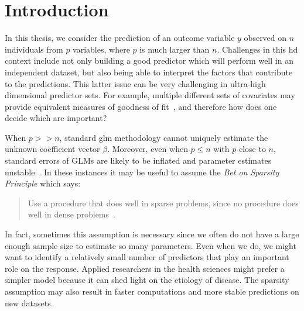 \chapter{Introduction\label{ch:introduction}}


In this thesis, we consider the prediction of an outcome variable $y$ observed on $n$ individuals from $p$ variables, where $p$ is much larger than $n$. 
Challenges in this \ac{hd} context include not only building a good predictor which will perform well in an independent dataset, but also being able to interpret the factors that contribute to the predictions. 
This latter issue can be very challenging in ultra-high dimensional predictor sets. 
For example, multiple different sets of covariates may provide equivalent measures of goodness of fit~\citep{fan2014challenges}, and therefore how does one decide which are important? 

When $p >>n$, standard \ac{glm} methodology cannot uniquely estimate the unknown coefficient vector $\beta$. 
Moreover, even when $p \leq n$ with $p$ close to $n$, standard errors of GLMs are likely to be inflated and parameter estimates unstable~\citep{reid2016study}. In these instances it may be useful to assume the \textit{Bet on Sparsity Principle} which says:
\begin{quote}
Use a procedure that does well in sparse problems,
since no procedure does well in dense problems~\citep{friedman2001elements}.
\end{quote}
In fact, sometimes this assumption is necessary since we often do not have a large enough sample size to estimate so many parameters. Even when we do, we might want to identify a relatively small number of predictors that play an important role on the response. Applied researchers in the health sciences might prefer a simpler model because it can shed light on the etiology of disease. The sparsity assumption may also result in faster computations and more stable predictions on new datasets. 

